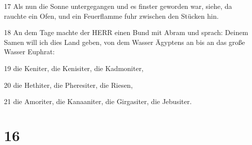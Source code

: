 \par 17 Als nun die Sonne untergegangen und es finster geworden war, siehe, da rauchte ein Ofen, und ein Feuerflamme fuhr zwischen den Stücken hin.
\par 18 An dem Tage machte der HERR einen Bund mit Abram und sprach: Deinem Samen will ich dies Land geben, von dem Wasser Ägyptens an bis an das große Wasser Euphrat:
\par 19 die Keniter, die Kenisiter, die Kadmoniter,
\par 20 die Hethiter, die Pheresiter, die Riesen,
\par 21 die Amoriter, die Kanaaniter, die Girgasiter, die Jebusiter.

\chapter{16}

